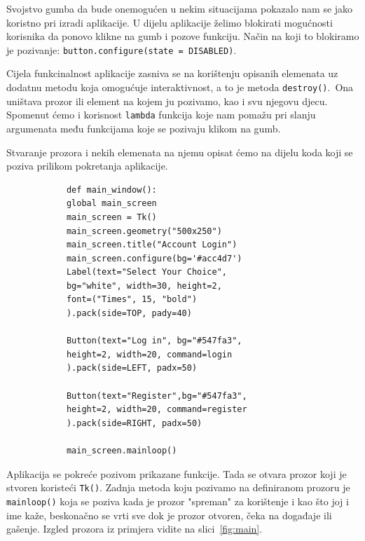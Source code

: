 \documentclass[titlepage, 12pt]{scrartcl}
\begin{document}
	Svojstvo gumba da bude onemogućen u nekim situacijama pokazalo nam se jako koristno pri izradi aplikacije. U dijelu aplikacije želimo blokirati mogućnosti korisnika da ponovo klikne na gumb i pozove funkciju. Način na koji to blokiramo je pozivanje: \texttt{button.configure(state = DISABLED)}.
	
	Cijela funkcinalnost aplikacije zasniva se na korištenju opisanih elemenata uz dodatnu metodu koja omogućuje interaktivnost, a to je metoda \texttt{destroy()}.\ Ona uništava prozor ili element na kojem ju pozivamo, kao i svu njegovu djecu. Spomenut ćemo i korisnost \texttt{lambda} funkcija koje nam pomažu pri slanju argumenata među funkcijama koje se pozivaju klikom na gumb. 
	
	Stvaranje prozora i nekih elemenata na njemu opisat ćemo na dijelu koda koji se poziva prilikom pokretanja aplikacije. 
	
	\begin{samepage}
		\begin{verbatim}
			def main_window():
			global main_screen
			main_screen = Tk()
			main_screen.geometry("500x250")
			main_screen.title("Account Login")
			main_screen.configure(bg='#acc4d7')
			Label(text="Select Your Choice", 
			bg="white", width=30, height=2, 
			font=("Times", 15, "bold")
			).pack(side=TOP, pady=40)
			
			Button(text="Log in", bg="#547fa3", 
			height=2, width=20, command=login
			).pack(side=LEFT, padx=50)
			
			Button(text="Register",bg="#547fa3", 
			height=2, width=20, command=register
			).pack(side=RIGHT, padx=50)
			
			main_screen.mainloop()
		\end{verbatim}
	\end{samepage}
	
	Aplikacija se pokreće pozivom prikazane funkcije. Tada se otvara prozor koji je stvoren koristeći \texttt{Tk()}. Zadnja metoda koju pozivamo na definiranom prozoru je \texttt{mainloop()} koja se poziva kada je prozor "spreman" za korištenje i kao što joj i ime kaže, beskonačno se vrti sve dok je prozor otvoren, čeka na događaje ili gašenje. Izgled prozora iz primjera vidite na slici~\ref{fig:main}. 
	
\end{document}
